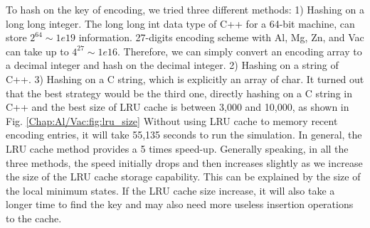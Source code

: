 To hash on the key of encoding, we tried three different methods: 1) Hashing on a long long integer. The long long int data type of C++ for a 64-bit machine, can store $2^{64} \sim 1e19$ information. 27-digits encoding scheme with Al, Mg, Zn, and Vac can take up to $4^{27} \sim 1e16$. Therefore, we can simply convert an encoding array to a decimal integer and hash on the decimal integer. 2) Hashing on a string of C++. 3) Hashing on a C string, which is explicitly an array of char. It turned out that the best strategy would be the third one, directly hashing on a C string in C++ and the best size of \ac{LRU} cache is between 3,000 and 10,000, as shown in Fig. \ref{Chap:Al/Vac:fig:lru_size} Without using \ac{LRU} cache to memory recent encoding entries, it will take 55,135 seconds to run the simulation. In general, the \ac{LRU} cache method provides a 5 times speed-up. Generally speaking, in all the three methods, the speed initially drops and then increases slightly as we increase the size of the \ac{LRU} cache storage capability. This can be explained by the size of the local minimum states. If the \ac{LRU} cache size increase, it will also take a longer time to find the key and may also need more useless insertion operations to the cache.


